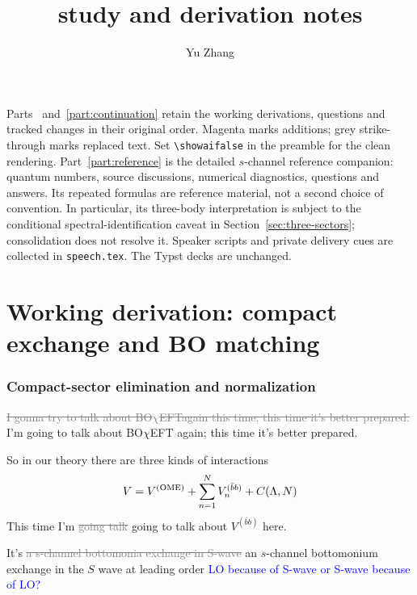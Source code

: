 \documentclass[11pt,a4paper]{article}
\title{\BOchiEFT{} study and derivation notes}
\author{Yu Zhang}
\date{}
\renewcommand{\VQQ}{V^{(\bar bb)}}
\renewcommand{\VOME}{V^{\rm (OME)}}
\renewcommand{\BOchiEFT}{BO$\chi$EFT}
\newcommand{\IDK}[1]{\textcolor{blue}{#1}}
\newif\ifshowai
\newcommand{\aifix}[2]{\textcolor{gray}{\sout{#1}} \textcolor{aicolor}{#2}}
\newcommand{\aifix}[2]{#2}
\begin{document}
\maketitle

\begin{keybox}
Parts~\ref{part:compact} and~\ref{part:continuation} retain the working
derivations, questions and tracked changes in their original order.
Magenta marks additions; grey strike-through marks replaced text.
Set \verb|\showaifalse| in the preamble for the clean rendering.
Part~\ref{part:reference} is the detailed $s$-channel reference companion:
quantum numbers, source discussions, numerical diagnostics, questions and
answers. Its repeated formulas are reference material, not a second choice
of convention. In particular, its three-body interpretation is subject to
the conditional spectral-identification caveat in
Section~\ref{sec:three-sectors}; consolidation does not resolve it.
Speaker scripts and private delivery cues are collected in
\texttt{speech.tex}. The Typst decks are unchanged.
\end{keybox}

\tableofcontents
\clearpage
\part{Working derivation: compact exchange and BO matching}
\label{part:compact}
\section{Compact-sector elimination and normalization}
\aifix{I gonna try to talk about \BOchiEFT again this time, this time it's better prepared.}{I'm going to talk about \BOchiEFT{} again; this time it's better prepared.}

So in our theory there are three kinds of interactions
\begin{equation}
	V = \VOME + \sum_{n=1}^N \VQQ_n + C(\Lambda, N)
\end{equation}
This time I'm \aifix{going talk}{going to talk} about $\VQQ$ here.

It's \aifix{a s-channel bottomonia exchange in S-wave}{an $s$-channel bottomonium exchange in the $S$ wave} at leading order \IDK{LO because of S-wave or S-wave because of LO?}
\end{document}
